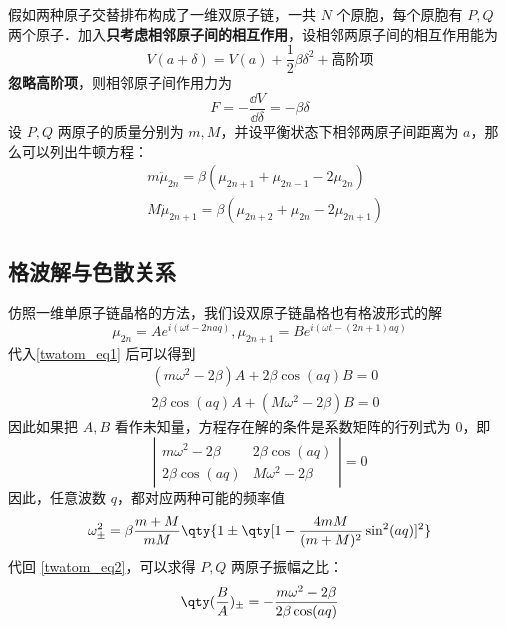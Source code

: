
假如两种原子交替排布构成了一维双原子链，一共 $N$ 个原胞，每个原胞有 $P,Q$ 两个原子．加入\textbf{只考虑相邻原子间的相互作用}，设相邻两原子间的相互作用能为
\begin{equation}
V(a+\delta)=V(a)+\frac{1}{2}\beta \delta^2+\text{高阶项}
\end{equation}
\textbf{忽略高阶项}，则相邻原子间作用力为
\begin{equation}
F=-\frac{\dd V}{\dd \delta}=-\beta \delta
\end{equation}
设 $P,Q$ 两原子的质量分别为 $m,M$，并设平衡状态下相邻两原子间距离为 $a$，那么可以列出牛顿方程：
\begin{equation}\label{twatom_eq1}
\begin{aligned}
&m\ddot \mu_{2n}=\beta(\mu_{2n+1}+\mu_{2n-1}-2\mu_{2n})\\
&M\ddot \mu_{2n+1}=\beta(\mu_{2n+2}+\mu_{2n}-2\mu_{2n+1})
\end{aligned}
\end{equation}
\subsection{格波解与色散关系}
仿照一维单原子链晶格的方法，我们设双原子链晶格也有格波形式的解
\begin{equation}
\mu_{2n}=A e^{i(\omega t - 2naq)},\mu_{2n+1}=B  e^{i(\omega t - (2n+1)aq)}
\end{equation}
代入\autoref{twatom_eq1} 后可以得到
\begin{equation}\label{twatom_eq2}
\begin{aligned}
&(m\omega^2-2\beta)A+2\beta\cos(aq)B=0\\
&2\beta\cos(aq)A+(M\omega^2-2\beta)B=0
\end{aligned}
\end{equation}
因此如果把 $A,B$ 看作未知量，方程存在解的条件是系数矩阵的行列式为 $0$，即
\begin{equation}
\left|
\begin{matrix}
m\omega^2-2\beta&2\beta\cos(aq)\\
2\beta\cos(aq)&M\omega^2-2\beta
\end{matrix}
\right|=0
\end{equation}
因此，任意波数 $q$，都对应两种可能的频率值
\begin{equation}
\omega_{\pm}^2=\beta\frac{m+M}{mM}\qty{1\pm \qty[1-\frac{4mM}{(m+M)^2}\sin^2(aq)]^2}
\end{equation}
代回 \autoref{twatom_eq2}，可以求得 $P,Q$ 两原子振幅之比：
\begin{equation}
\qty(\frac{B}{A})_{\pm}=-\frac{m\omega^2-2\beta}{2\beta\cos(aq)}
\end{equation}

